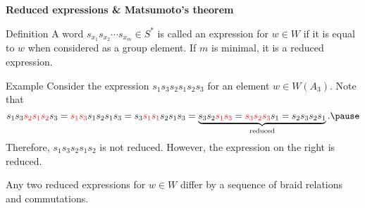 \documentclass[9pt,handout]{beamer}
\newcommand{\<}{\langle}
\renewcommand{\>}{\rangle}
\begin{document}
\begin{frame}{\textbf{Reduced expressions \& Matsumoto's theorem}}

\begin{block}{Definition}
A word $s_{x_1}s_{x_2}\cdots s_{x_m}\in S^{*}$ is called an \alert{expression} for $w\in W$ if it is equal to $w$ when considered as a group element. If $m$ is minimal, it is a \alert{reduced expression}.
\end{block}

\pause
    
\begin{block}{Example}
Consider the expression $s_1s_3s_2s_1s_2s_3$ for an element $w\in W(A_3)$. Note that
	\[
    s_1s_3{\color{red}s_2s_1s_2}s_3={\color{red}s_1s_3}s_1s_2s_1s_3=s_3{\color{red}s_1s_1}s_2s_1s_3=
    \underbrace{s_3s_2{\color{red}s_1s_3}={\color{red}s_3s_2s_3}s_1=s_2s_3s_2s_1}_{\text{reduced}}. 
    \pause
    \]
Therefore, $s_1s_3s_2s_1s_2$ is not reduced.  However, the expression on the right is reduced.
\end{block}

\pause

\begin{theorem}
Any two reduced expressions for $w\in W$ differ by a sequence of braid relations and commutations.
\end{theorem}

\end{frame}

\end{document}
